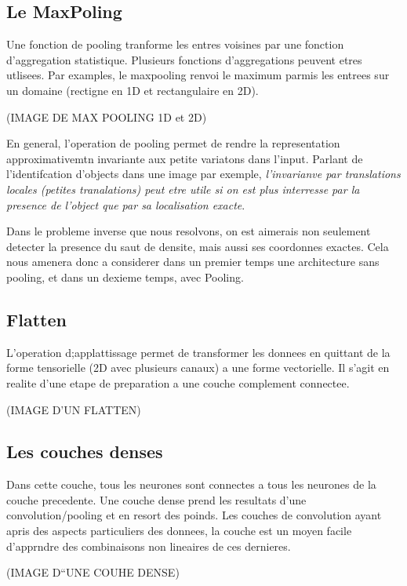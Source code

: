 \subsection{Le MaxPoling}
Une fonction de pooling tranforme les entres voisines par une fonction d'aggregation statistique. Plusieurs fonctions d'aggregations peuvent etres utlisees. Par examples, le maxpooling renvoi le maximum parmis les entrees sur un domaine (rectigne en 1D et rectangulaire en 2D). 

(IMAGE DE MAX POOLING 1D et 2D)

En general, l'operation de pooling permet de rendre la representation approximativemtn invariante aux petite variatons dans l'input. Parlant de l'identifcation d'objects dans une image par exemple, \textit{l'invarianve par translations locales (petites tranalations) peut etre utile si on est plus interresse par la presence de l'object que par sa localisation exacte}\parencite[321ff.]{Reference5}.

Dans le probleme inverse que nous resolvons, on est aimerais non seulement detecter la presence du saut de densite, mais aussi ses coordonnes exactes. Cela nous amenera donc a considerer dans un premier temps une architecture sans pooling, et dans un dexieme temps, avec Pooling.
 
\subsection{Flatten}
L'operation d;applattissage permet de transformer les donnees en quittant de la forme tensorielle (2D avec plusieurs canaux) a une forme vectorielle. Il s'agit en realite d'une etape de preparation a une couche complement connectee.

(IMAGE D'UN FLATTEN)

\subsection{Les couches denses}
Dans cette couche, tous les neurones sont connectes a tous les neurones de la couche precedente. Une couche dense prend les resultats d'une convolution/pooling et en resort des poinds. Les couches de convolution ayant apris des aspects particuliers des donnees, la couche est un moyen facile d'apprndre des combinaisons non lineaires de ces dernieres.

(IMAGE D``UNE COUHE DENSE)



